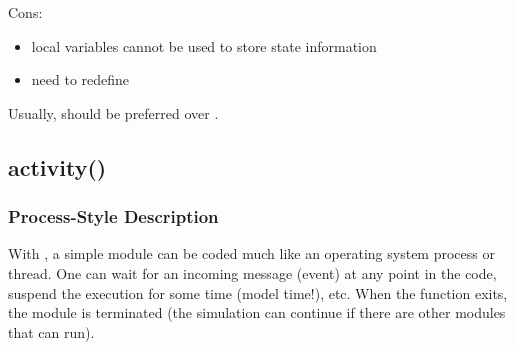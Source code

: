 Cons:
\begin{itemize}
  \item local variables cannot be used to store state information
  \item need to redefine 
\end{itemize}

Usually,  should be preferred over .


%
%



\subsection{activity()}
\label{sec:simple-modules:activity}

\subsubsection{Process-Style Description}
\label{sec:simple-modules:activity:overview}

With , a simple module can be coded much like an
operating system process or thread. One can wait for an incoming message
(event) at any point in the code, suspend the execution for some time
(model time!), etc. When the  function exits, the module
is terminated (the simulation can continue if there are other modules
that can run).

